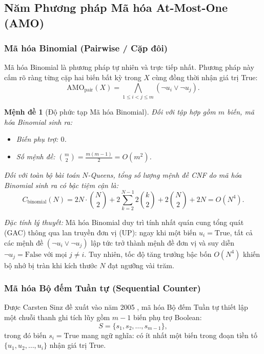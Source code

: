 \documentclass[a4paper,fleqn]{cas-sc}
\newtheorem{proposition}{Mệnh đề}
\begin{document}
\subsection{Năm Phương pháp Mã hóa At-Most-One (AMO)}

\subsubsection{Mã hóa Binomial (Pairwise / Cặp đôi)}
Mã hóa Binomial là phương pháp tự nhiên và trực tiếp nhất. Phương pháp này cấm rõ ràng từng cặp hai biến bất kỳ trong $X$ cùng đồng thời nhận giá trị True:
\begin{equation}
    \text{AMO}_{\text{pair}}(X) = \bigwedge_{1 \le i < j \le m} (\neg u_i \lor \neg u_j).
\end{equation}

\begin{proposition}[Độ phức tạp Mã hóa Binomial]
Đối với tập hợp gồm $m$ biến, mã hóa Binomial sinh ra:
\begin{itemize}
    \item Biến phụ trợ: $0$.
    \item Số mệnh đề: $\binom{m}{2} = \frac{m(m-1)}{2} = O(m^2)$.
\end{itemize}
Đối với toàn bộ bài toán $N$-Queens, tổng số lượng mệnh đề CNF do mã hóa Binomial sinh ra có bậc tiệm cận là:
\begin{equation}
    C_{\text{binomial}}(N) = 2N \cdot \binom{N}{2} + 2 \sum_{k=2}^{N-1} 2\binom{k}{2} + 2\binom{N}{2} + 2N = O(N^4).
\end{equation}
\end{proposition}

\textit{Đặc tính lý thuyết:} Mã hóa Binomial duy trì tính nhất quán cung tổng quát (GAC) thông qua lan truyền đơn vị (UP): ngay khi một biến $u_i = \text{True}$, tất cả các mệnh đề $(\neg u_i \lor \neg u_j)$ lập tức trở thành mệnh đề đơn vị và suy diễn $\neg u_j = \text{False}$ với mọi $j \neq i$. Tuy nhiên, tốc độ tăng trưởng bậc bốn $O(N^4)$ khiến bộ nhớ bị tràn khi kích thước $N$ đạt ngưỡng vài trăm.

\subsubsection{Mã hóa Bộ đếm Tuần tự (Sequential Counter)}
Được Carsten Sinz đề xuất vào năm 2005 \cite{sinz2005towards}, mã hóa Bộ đếm Tuần tự thiết lập một chuỗi thanh ghi tích lũy gồm $m - 1$ biến phụ trợ Boolean:
\begin{equation}
    S = \{s_1, s_2, \dots, s_{m-1}\},
\end{equation}
trong đó biến $s_i = \text{True}$ mang ngữ nghĩa: có ít nhất một biến trong đoạn tiền tố $\{u_1, u_2, \dots, u_i\}$ nhận giá trị True.
\end{document}
